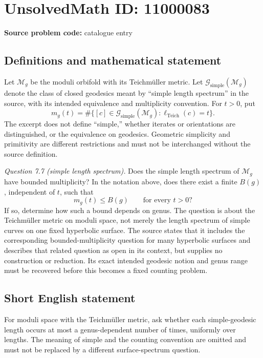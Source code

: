 \documentclass[11pt]{article}
\begin{document}
\section*{UnsolvedMath ID: 11000083}
\textbf{Source problem code:} catalogue entry
\subsection{Definitions and mathematical statement}
Let \(\mathcal M_g\) be the moduli orbifold with its Teichm\"uller metric. Let \(\mathscr G_{\mathrm{simple}}(\mathcal M_g)\) denote the class of closed geodesics meant by ``simple length spectrum'' in the source, with its intended equivalence and multiplicity convention. For \(t>0\), put
\[
 m_g(t)=\#\{[c]\in\mathscr G_{\mathrm{simple}}(\mathcal M_g):
 \ell_{\mathrm{Teich}}(c)=t\}.
\]
The excerpt does not define ``simple,'' whether iterates or orientations are distinguished, or the equivalence on geodesics. Geometric simplicity and primitivity are different restrictions and must not be interchanged without the source definition.

\emph{Question 7.7 (simple length spectrum).} Does the simple length spectrum of \(\mathcal M_g\) have bounded multiplicity? In the notation above, does there exist a finite \(B(g)\), independent of \(t\), such that
\[
 m_g(t)\leq B(g)\qquad\text{for every }t>0?
\]
If so, determine how such a bound depends on genus. The question is about the Teichm\"uller metric on moduli space, not merely the length spectrum of simple curves on one fixed hyperbolic surface. The source states that it includes the corresponding bounded-multiplicity question for many hyperbolic surfaces and describes that related question as open in its context, but supplies no construction or reduction. Its exact intended geodesic notion and genus range must be recovered before this becomes a fixed counting problem.
\subsection{Short English statement}
For moduli space with the Teichm\"uller metric, ask whether each simple-geodesic length occurs at most a genus-dependent number of times, uniformly over lengths. The meaning of simple and the counting convention are omitted and must not be replaced by a different surface-spectrum question.
\end{document}
